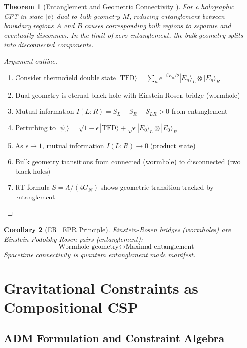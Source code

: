 \documentclass[11pt,a4paper]{article}
\newtheorem{theorem}{Theorem}[section]
\newtheorem{corollary}[theorem]{Corollary}
\theoremstyle{remark}
\theoremstyle{definition}
\begin{document}
\begin{theorem}[Entanglement and Geometric Connectivity \cite{VanRaamsdonk2010}]
\label{thm:van_raamsdonk}
For a holographic CFT in state $|\psi\rangle$ dual to bulk geometry $M$, reducing entanglement between boundary regions $A$ and $B$ causes corresponding bulk regions to separate and eventually disconnect. In the limit of zero entanglement, the bulk geometry splits into disconnected components.
\end{theorem}

\begin{proof}[Argument outline]
\begin{enumerate}
\item Consider thermofield double state $|\text{TFD}\rangle = \sum_n e^{-\beta E_n/2} |E_n\rangle_L \otimes |E_n\rangle_R$
\item Dual geometry is eternal black hole with Einstein-Rosen bridge (wormhole)
\item Mutual information $I(L:R) = S_L + S_R - S_{LR} > 0$ from entanglement
\item Perturbing to $|\psi_\epsilon\rangle = \sqrt{1-\epsilon}|\text{TFD}\rangle + \sqrt{\epsilon}|E_0\rangle_L \otimes |E_0\rangle_R$
\item As $\epsilon \to 1$, mutual information $I(L:R) \to 0$ (product state)
\item Bulk geometry transitions from connected (wormhole) to disconnected (two black holes)
\item RT formula $S = A/(4G_N)$ shows geometric transition tracked by entanglement
\end{enumerate}
\end{proof}

\begin{corollary}[ER=EPR Principle]
Einstein-Rosen bridges (wormholes) are Einstein-Podolsky-Rosen pairs (entanglement):
\begin{equation}
\text{Wormhole geometry} \leftrightarrow \text{Maximal entanglement}
\end{equation}
Spacetime connectivity is quantum entanglement made manifest.
\end{corollary}

\section{Gravitational Constraints as Compositional CSP}
\label{sec:constraint_formulation}

\subsection{ADM Formulation and Constraint Algebra}
\end{document}
